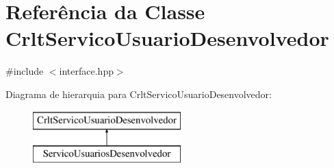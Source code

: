 \hypertarget{class_crlt_servico_usuario_desenvolvedor}{}\section{Referência da Classe Crlt\+Servico\+Usuario\+Desenvolvedor}
\label{class_crlt_servico_usuario_desenvolvedor}


{\ttfamily \#include $<$interface.\+hpp$>$}

Diagrama de hierarquia para Crlt\+Servico\+Usuario\+Desenvolvedor\+:\begin{figure}[H]
\begin{center}
\leavevmode
\includegraphics[height=2.000000cm]{class_crlt_servico_usuario_desenvolvedor}
\end{center}
\end{figure}
